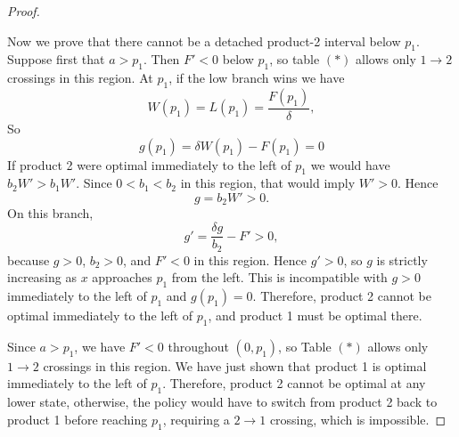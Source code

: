 \documentclass[11pt]{article}
\begin{document}
\begin{proof}
\begin{figure}[H]
\centering
{}
\end{figure}

Now we prove that there cannot be a detached product-2 interval below $p_1$. Suppose first that $a>p_1$. Then $F'<0$ below $p_1$, so table $(*)$
allows only $1\to2$ crossings in this region. At $p_1$, if the low branch wins we have
\begin{equation*}
    W(p_1)=L(p_1)=\frac{F(p_1)}{\delta},
\end{equation*}
So 
\begin{equation*}
    g(p_1)= \delta W(p_1) - F(p_1) =0
\end{equation*}
If product 2 were optimal immediately to the left of $p_1$ we would have $b_2W'>b_1W'$. Since $0<b_1<b_2$ in this region, that would imply $W'>0$. Hence
\begin{equation*}
    g=b_2W'>0.
\end{equation*}
On this branch,
\begin{equation*}
    g'=\frac{\delta g}{b_2}-F'>0,
\end{equation*}
because $g>0$, $b_2>0$, and $F'<0$ in this region. Hence $g'>0$, so $g$ is strictly increasing as $x$ approaches $p_1$ from the left. This is incompatible with $g>0$ immediately to the left of $p_1$ and
$g(p_1)=0$. Therefore, product 2 cannot be optimal immediately to the left of $p_1$, and product 1 must be optimal there.

Since $a>p_1$, we have $F'<0$ throughout $(0,p_1)$, so Table $(*)$ allows only $1\to2$ crossings in this region. We have just shown that product 1 is optimal immediately to the left of $p_1$. Therefore, product 2 cannot be optimal at any lower state, otherwise, the policy would have to switch from product 2 back to product 1 before reaching $p_1$, requiring a $2\to1$ crossing, which is impossible.


\end{proof}
\end{document}
